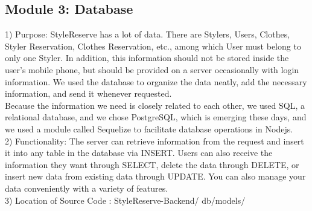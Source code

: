 \documentclass[conference]{IEEEtran}
\begin{document}
\subsection{Module 3: Database}
1) Purpose: StyleReserve has a lot of data. There are Stylers, Users, Clothes, Styler Reservation, Clothes Reservation, etc., among which User must belong to only one Styler. In addition, this information should not be stored inside the user's mobile phone, but should be provided on a server occasionally with login information. We used the database to organize the data neatly, add the necessary information, and send it whenever requested.\\
Because the information we need is closely related to each other, we used SQL, a relational database, and we chose PostgreSQL, which is emerging these days, and we used a module called Sequelize to facilitate database operations in Nodejs.\\

2) Functionality: The server can retrieve information from the request and insert it into any table in the database via INSERT. Users can also receive the information they want through SELECT, delete the data through DELETE, or insert new data from existing data through UPDATE. You can also manage your data conveniently with a variety of features.\\

3) Location of Source Code : StyleReserve-Backend/ db/models/\\
\end{document}
